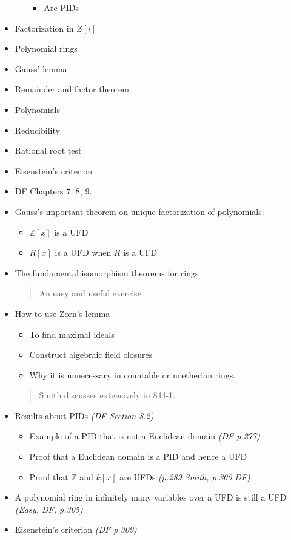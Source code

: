 \begin{itemize}
\begin{itemize}
    \begin{itemize}
    \tightlist
    \item
      Are PIDs
    \end{itemize}
  \end{itemize}
\item
  Factorization in \(Z[i]\)
\item
  Polynomial rings
\item
  Gauss' lemma
\item
  Remainder and factor theorem
\item
  Polynomials
\item
  Reducibility
\item
  Rational root test
\item
  Eisenstein's criterion
\item
  DF Chapters 7, 8, 9.
\item
  Gauss's important theorem on unique factorization of polynomials:

  \begin{itemize}
  \tightlist
  \item
    \({\mathbb{Z}}[x]\) is a UFD
  \item
    \(R[x]\) is a UFD when \(R\) is a UFD
  \end{itemize}
\item
  The fundamental isomorphism theorems for rings

  \begin{quote}
  An easy and useful exercise
  \end{quote}
\item
  How to use Zorn's lemma

  \begin{itemize}
  \tightlist
  \item
    To find maximal ideals
  \item
    Construct algebraic field closures
  \item
    Why it is unnecessary in countable or noetherian rings.
  \end{itemize}

  \begin{quote}
  Smith discusses extensively in 844-1.
  \end{quote}
\item
  Results about PIDs \emph{(DF Section 8.2)}

  \begin{itemize}
  \item
    Example of a PID that is not a Euclidean domain \emph{(DF p.277)}
  \item
    Proof that a Euclidean domain is a PID and hence a UFD
  \item
    Proof that \({\mathbb{Z}}\) and \(k[x]\) are UFDs \emph{(p.289
    Smith, p.300 DF)}
  \end{itemize}
\item
  A polynomial ring in infinitely many variables over a UFD is still a
  UFD \emph{(Easy, DF, p.305)}
\item
  Eisenstein's criterion \emph{(DF p.309)}


\end{itemize}
